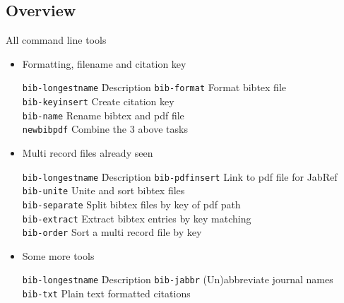 \documentclass[xcolor={table,dvipsnames}]{beamer}
\begin{document}
\subsection{Overview}
\begin{frame}{All command line tools}
  \begin{itemize}
    \itemsep-6pt

    \item Formatting, filename and citation key
      \begin{tabbing}
        \texttt{bib-longestname} \= Description \kill
        \texttt{bib-format} \> Format bibtex file \\
        \texttt{bib-keyinsert} \> Create citation key \\
        \texttt{bib-name} \> Rename bibtex and pdf file \\
        \alert<1>{\texttt{newbibpdf}} \> Combine the 3 above tasks \\
      \end{tabbing}

    \item Multi record files
	\hfill\alert{already seen}\quad\hbox{\,}
      \begin{tabbing}
        \texttt{bib-longestname} \= Description \kill
        \alert{\texttt{bib-pdfinsert}} \> Link to pdf file for JabRef \\
        \alert{\texttt{bib-unite}} \> Unite and sort bibtex files \\
        \alert{\texttt{bib-separate}} \> Split bibtex files by key of pdf path \\
        \texttt{bib-extract} \> Extract bibtex entries by key matching \\
        \texttt{bib-order} \> Sort a multi record file by key \\
      \end{tabbing}

    \item Some more tools
      \begin{tabbing}
        \texttt{bib-longestname} \= Description \kill
        \texttt{bib-jabbr} \> (Un)abbreviate journal names \\
        \texttt{bib-txt} \> Plain text formatted citations \\
      \end{tabbing}

    \end{itemize}
\end{frame}
\end{document}
